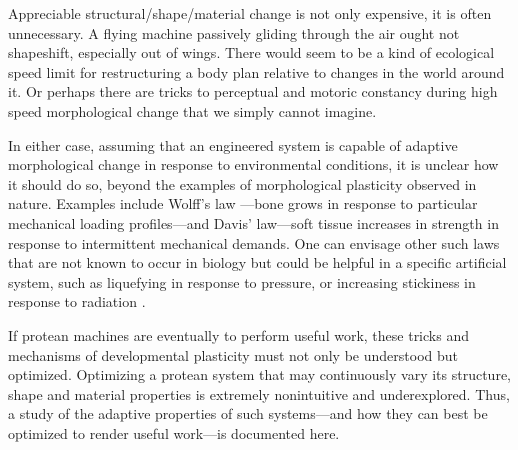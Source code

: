 Appreciable 
structural/shape/material 
change is not only expensive, it is often unnecessary.
A flying machine passively gliding through the air
ought not shapeshift, especially out of wings.
There would seem to be a kind of ecological speed limit for restructuring a body plan relative to changes in the world around it.
Or perhaps there are tricks to perceptual and motoric constancy during high speed morphological change that we simply cannot imagine.




In either case, assuming that an engineered system is capable of adaptive morphological change in response to environmental conditions, it is unclear how it should do so, beyond the examples of morphological plasticity observed in nature. 
Examples include Wolff's law \cite{ruff2006s}---bone grows in response to particular mechanical loading profiles---and Davis' law---soft tissue increases in strength in response to intermittent mechanical demands.
One can envisage other such laws that are not known to occur in biology but could be helpful in a specific artificial system, 
such as 
liquefying
in response to pressure, or
increasing stickiness in response to radiation \cite{nasa1970radiation}.


If protean machines are eventually to perform useful work, 
these tricks and mechanisms
of developmental plasticity 
must not only be understood but optimized.
Optimizing a protean system that may 
continuously vary its structure, shape and material properties
is extremely nonintuitive and underexplored.
Thus, a study of the adaptive properties of such systems---and how they can best be optimized to render useful work---is documented here. 



